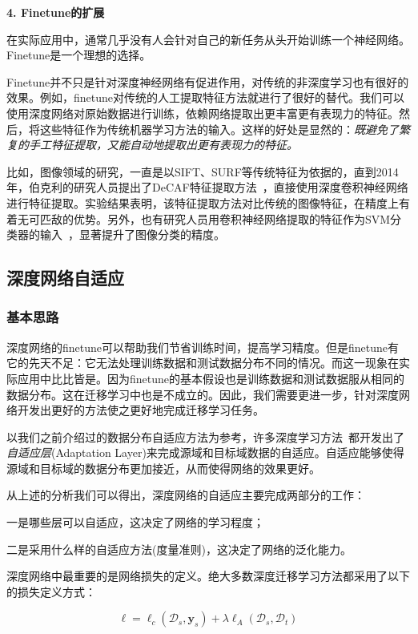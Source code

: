 \textbf{4. Finetune的扩展}

在实际应用中，通常几乎没有人会针对自己的新任务从头开始训练一个神经网络。Finetune是一个理想的选择。

Finetune并不只是针对深度神经网络有促进作用，对传统的非深度学习也有很好的效果。例如，finetune对传统的人工提取特征方法就进行了很好的替代。我们可以使用深度网络对原始数据进行训练，依赖网络提取出更丰富更有表现力的特征。然后，将这些特征作为传统机器学习方法的输入。这样的好处是显然的：\textit{既避免了繁复的手工特征提取，又能自动地提取出更有表现力的特征。}

比如，图像领域的研究，一直是以SIFT、SURF等传统特征为依据的，直到2014年，伯克利的研究人员提出了DeCAF特征提取方法~\cite{donahue2014decaf}，直接使用深度卷积神经网络进行特征提取。实验结果表明，该特征提取方法对比传统的图像特征，在精度上有着无可匹敌的优势。另外，也有研究人员用卷积神经网络提取的特征作为SVM分类器的输入~\cite{razavian2014cnn}，显著提升了图像分类的精度。

\subsection{深度网络自适应}

\subsubsection{基本思路}

深度网络的finetune可以帮助我们节省训练时间，提高学习精度。但是finetune有它的先天不足：它无法处理训练数据和测试数据分布不同的情况。而这一现象在实际应用中比比皆是。因为finetune的基本假设也是训练数据和测试数据服从相同的数据分布。这在迁移学习中也是不成立的。因此，我们需要更进一步，针对深度网络开发出更好的方法使之更好地完成迁移学习任务。

以我们之前介绍过的数据分布自适应方法为参考，许多深度学习方法~\cite{tzeng2014deep,long2015learning}都开发出了\textit{自适应层}(Adaptation Layer)来完成源域和目标域数据的自适应。自适应能够使得源域和目标域的数据分布更加接近，从而使得网络的效果更好。

从上述的分析我们可以得出，深度网络的自适应主要完成两部分的工作：

一是哪些层可以自适应，这决定了网络的学习程度；

二是采用什么样的自适应方法(度量准则)，这决定了网络的泛化能力。

深度网络中最重要的是网络损失的定义。绝大多数深度迁移学习方法都采用了以下的损失定义方式：

\begin{equation}
	\ell = \ell_c(\mathcal{D}_s,\mathbf{y}_s) + \lambda \ell_A(\mathcal{D}_s,\mathcal{D}_t)
\end{equation}

